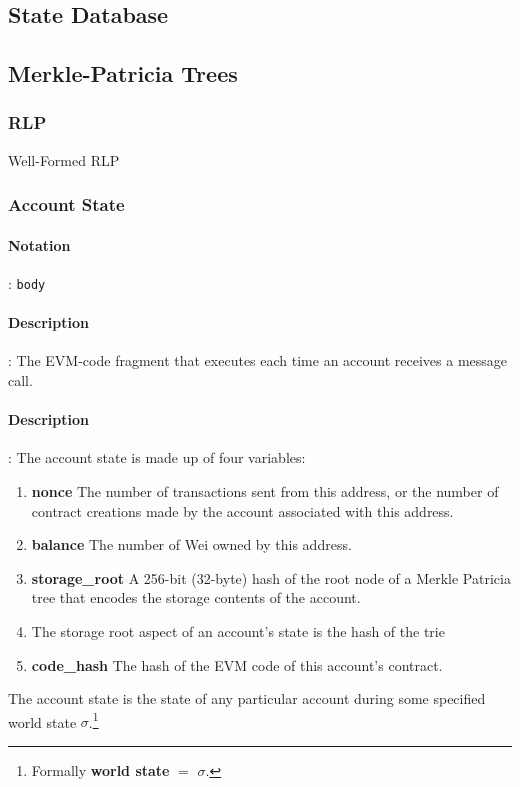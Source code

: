 \documentclass[10pt,a4paper,leqno,bibliography=totoc]{scrartcl}
\newenvironment{alphafootnotes}
{\par\edef\savedfootnotenumber{\number\value{footnote}}
\renewcommand{\thefootnote}{\alph{footnote}}
\setcounter{footnote}{0}}
{\par\setcounter{footnote}{\savedfootnotenumber}}
\begin{document}
\begin{alphafootnotes}
\begin{multicols*}{2}
		\subsection{State Database}

		\subsection{Merkle-Patricia Trees}

			\subsubsection{RLP}
				Well-Formed RLP
	
			\subsubsection{Account State}
				\paragraph{Notation}: \texttt{body}
				\paragraph{Description}: The EVM-code fragment that executes each time an account receives a message call. 

				\paragraph{Description}: The account state is made up of four variables:
				\begin{enumerate}
					\item \textbf{nonce} The number of transactions sent from this address, or the number of contract creations made by the account associated with this address.
					\item \textbf{balance} The number of Wei owned by this address.
					\item \textbf{storage\_root} A 256-bit (32-byte) hash of the root node of a Merkle Patricia tree that encodes the storage contents of the account.
					\item The storage root aspect of an account’s state is the hash of the trie
					\item \textbf{code\_hash} The hash of the EVM code of this account's contract.
				\end{enumerate}

				The account state is the state of any particular account during some specified world state $\sigma$.\footnote{Formally \textbf{world state} $=$ $\sigma$.} \par


\end{multicols*}
\end{alphafootnotes}
\end{document}
